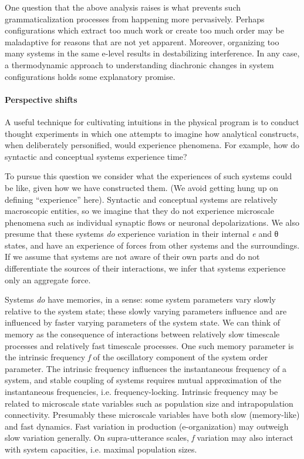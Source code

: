 One question that the above analysis raises is what prevents such grammaticalization processes from happening more pervasively. Perhaps configurations which extract too much work or create too much order may be maladaptive for reasons that are not yet apparent. Moreover, organizing too many systems in the same e-level results in destabilizing interference. In any case, a thermodynamic approach to understanding diachronic changes in system configurations holds some explanatory promise.

\paragraph{Perspective shifts}

A useful technique for cultivating intuitions in the physical program is to conduct thought experiments in which one attempts to imagine how analytical constructs, when deliberately personified, would experience phenomena. For example, how do syntactic and conceptual systems experience time? 

  To pursue this question we consider what the experiences of such systems could be like, given how we have constructed them. (We avoid getting hung up on defining “experience” here). Syntactic and conceptual systems are relatively macroscopic entities, so we imagine that they do not experience microscale phenomena such as individual synaptic flows or neuronal depolarizations. We also presume that these systems \textit{do} experience variation in their internal \textit{e} and θ states, and have an experience of forces from other systems and the surroundings. If we assume that systems are not aware of their own parts and do not differentiate the sources of their interactions, we infer that systems experience only an aggregate force. 

  Systems \textit{do} have memories, in a sense: some system parameters vary slowly relative to the system state; these slowly varying parameters influence and are influenced by faster varying parameters of the system state. We can think of memory as the consequence of interactions between relatively slow timescale processes and relatively fast timescale processes. One such memory parameter is the intrinsic frequency \textit{f} of the oscillatory component of the system order parameter. The intrinsic frequency influences the instantaneous frequency of a system, and stable coupling of systems requires mutual approximation of the instantaneous frequencies, i.e. frequency-locking. Intrinsic frequency may be related to microscale state variables such as population size and intrapopulation connectivity. Presumably these microscale variables have both slow (memory-like) and fast dynamics. Fast variation in production (e-organization) may outweigh slow variation generally. On supra-utterance scales, \textit{f} variation may also interact with system capacities, i.e. maximal population sizes. 

